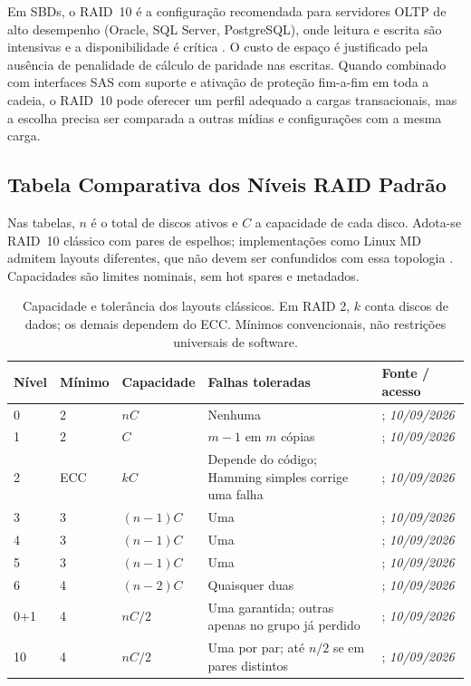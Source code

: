 \documentclass[titlepage]{article}
\newcommand{\acesso}{\textit{10/09/2026}}
\begin{document}
Em SBDs, o RAID~10 é a configuração recomendada para servidores OLTP de alto desempenho (Oracle, SQL Server, PostgreSQL), onde leitura e escrita são intensivas e a disponibilidade é crítica \cite{silberschatz2020,redhat_raid}. O custo de espaço é justificado pela ausência de penalidade de cálculo de paridade nas escritas. Quando combinado com interfaces SAS com suporte e ativação de proteção fim-a-fim em toda a cadeia, o RAID~10 pode oferecer um perfil adequado a cargas transacionais, mas a escolha precisa ser comparada a outras mídias e configurações com a mesma carga.

\subsection{Tabela Comparativa dos Níveis RAID Padrão}
Nas tabelas, $n$ é o total de discos ativos e $C$ a capacidade de cada disco. Adota-se RAID~10 clássico com pares de espelhos; implementações como Linux MD admitem layouts diferentes, que não devem ser confundidos com essa topologia \cite{redhat_raid}. Capacidades são limites nominais, sem hot spares e metadados.
\begin{table}[htbp]
\centering\footnotesize
\begin{tabularx}{\textwidth}{lllp{}X}
\toprule
Nível & Mínimo & Capacidade & Falhas toleradas & Fonte / acesso \\
\midrule
0 & 2 & $nC$ & Nenhuma & \cite{redhat_raid}; \acesso \\
1 & 2 & $C$ & $m-1$ em $m$ cópias & \cite{redhat_raid}; \acesso \\
2 & ECC & $kC$ & Depende do código; Hamming simples corrige uma falha & \cite{patterson1988}; \acesso \\
3 & 3 & $(n-1)C$ & Uma & \cite{patterson1988}; \acesso \\
4 & 3 & $(n-1)C$ & Uma & \cite{redhat_raid}; \acesso \\
5 & 3 & $(n-1)C$ & Uma & \cite{redhat_raid}; \acesso \\
6 & 4 & $(n-2)C$ & Quaisquer duas & \cite{redhat_raid}; \acesso \\
0+1 & 4 & $nC/2$ & Uma garantida; outras apenas no grupo já perdido & \cite{dbbook_storage}; \acesso \\
10 & 4 & $nC/2$ & Uma por par; até $n/2$ se em pares distintos & \cite{dbbook_storage}; \acesso \\
\bottomrule
\end{tabularx}
\caption{Capacidade e tolerância dos layouts clássicos. Em RAID 2, $k$ conta discos de dados; os demais dependem do ECC. Mínimos convencionais, não restrições universais de software.}
\label{tab:raid_comparativo}
\end{table}
\end{document}
